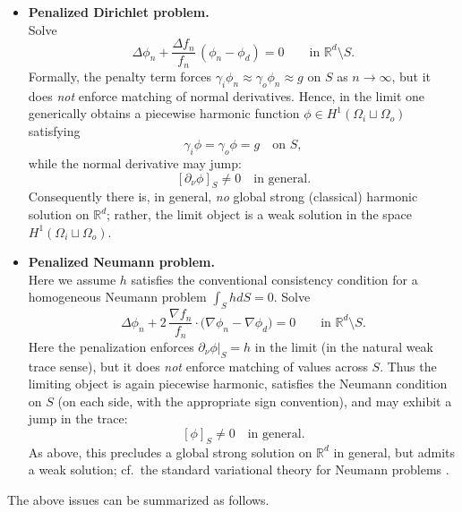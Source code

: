 \documentclass[preprint,12pt]{elsarticle}
\theoremstyle{plain}
\theoremstyle{definition}
\theoremstyle{note}
\newcommand{\R}{\mathbb{R}}
\begin{document}
\begin{itemize}
\item \textbf{Penalized Dirichlet problem.}\\
Solve
\begin{equation}
\label{eq:penalized-Dirichlet}
\Delta \phi_n + \frac{\Delta f_n}{f_n}\,(\phi_n-\phi_d)=0\qquad \text{in }\R^d\setminus S.
\end{equation}
Formally, the penalty term forces $\gamma_i\phi_n\approx \gamma_o\phi_n\approx g$ on $S$ as
$n\to\infty$, but it does \emph{not} enforce matching of normal derivatives. Hence, in the limit one generically obtains a piecewise harmonic function $\phi\in H^1(\Omega_i\sqcup\Omega_o)$ satisfying
\[
\gamma_i\phi=\gamma_o\phi=g \quad\text{on }S,
\]
while the normal derivative may jump:
\[
[\partial_\nu\phi]_S\neq 0 \quad \text{in general}.
\]
Consequently there is, in general, \emph{no} global strong (classical) harmonic solution on $\R^d$; rather, the limit object is a weak solution in the space $H^1(\Omega_i\sqcup\Omega_o)$.

\item \textbf{Penalized Neumann problem.} \\
Here we assume $h$ satisfies the conventional consistency condition for a homogeneous Neumann problem $\int_S hdS=0$. Solve 
\begin{equation}
\label{eq:penalized-Neumann}
\Delta \phi_n + 2\,\frac{\nabla f_n}{f_n}\cdot\bigl(\nabla\phi_n-\nabla\phi_d\bigr)=0
\qquad \text{in }\R^d\setminus S.
\end{equation}
Here the penalization enforces $\partial_\nu\phi|_S=h$ in the limit (in the natural weak trace sense), but it does \emph{not} enforce matching of values across $S$. Thus the limiting object is again piecewise harmonic, satisfies the Neumann condition on $S$ (on each side, with the appropriate sign convention), and may exhibit a jump in the trace:
\[
[\phi]_S\neq 0 \quad \text{in general}.
\]
As above, this precludes a global strong solution on $\R^d$ in general, but admits a weak solution; cf.\ the standard variational theory for Neumann problems \cite{LionsMagenes1972,Evans2010}.
\end{itemize}

\noindent
The above issues can be summarized as follows.
\end{document}
